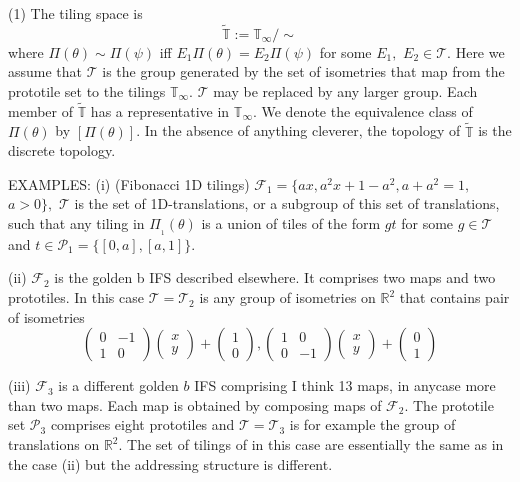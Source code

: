 \documentclass{amsproc}
\theoremstyle{plain}
\theoremstyle{definition}
\numberwithin{equation}{section}
\begin{document}
(1) The tiling space is%
\begin{equation*}
\widetilde{\mathbb{T}}:=\mathbb{T}_{\infty}/\sim
\end{equation*}
where $\Pi(\theta)\sim\Pi(\psi)$ iff $E_{1}\Pi(\theta)=E_{2}\Pi(\psi)$ for
some $E_{1},$ $E_{2}\in\mathcal{T}$. Here we assume that $\mathcal{T}$ is
the group generated by the set of isometries that map from the prototile set
to the tilings $\mathbb{T}_{\infty}$. $\mathcal{T}$ may be replaced by any
larger group. Each member of $\widetilde{\mathbb{T}}$ has a representative
in $\mathbb{T}_{\infty}$. We denote the equivalence class of $\Pi(\theta)$
by $\left[ \Pi(\theta)\right] $. In the absence of anything cleverer, the
topology of $\widetilde{\mathbb{T}}$ is the discrete topology.

EXAMPLES: (i) (Fibonacci 1D tilings) $\mathcal{F}_{1}\mathcal{=\{}%
ax,a^{2}x+1-a^{2},a+a^{2}=1,$ $a>0\},$ $\mathcal{T}$ is the set of
1D-translations, or a subgroup of this set of translations, such that any
tiling in $\Pi_{_{1}}(\theta)$ is a union of tiles of the form $gt$ for some 
$g\in\mathcal{T}$ and $t\in\mathcal{P}_{1}=\{[0,a],[a,1]\}$.

(ii) $\mathcal{F}_{2}$ is the golden b IFS described elsewhere. It comprises
two maps and two prototiles. In this case $\mathcal{T=T}_{2}$ is any group
of isometries on $\mathbb{R}^{2}$ that contains pair of isometries%
\begin{equation*}
\begin{pmatrix}
0 & -1 \\ 
1 & 0%
\end{pmatrix}%
\begin{pmatrix}
x \\ 
y%
\end{pmatrix}
+%
\begin{pmatrix}
1 \\ 
0%
\end{pmatrix}
,%
\begin{pmatrix}
1 & 0 \\ 
0 & -1%
\end{pmatrix}%
\begin{pmatrix}
x \\ 
y%
\end{pmatrix}
+%
\begin{pmatrix}
0 \\ 
1%
\end{pmatrix}%
\end{equation*}

(iii) $\mathcal{F}_{3}$ is a different golden $b$ IFS comprising I think 13
maps, in anycase more than two maps. Each map is obtained by composing maps
of $\mathcal{F}_{2}$. The prototile set $\mathcal{P}_{3}$ comprises eight
prototiles and $\mathcal{T}=\mathcal{T}_{3}$ is for example the group of
translations on $\mathbb{R}^{2}$. The set of tilings of in this case are
essentially the same as in the case (ii) but the addressing structure is
different.
\end{document}
